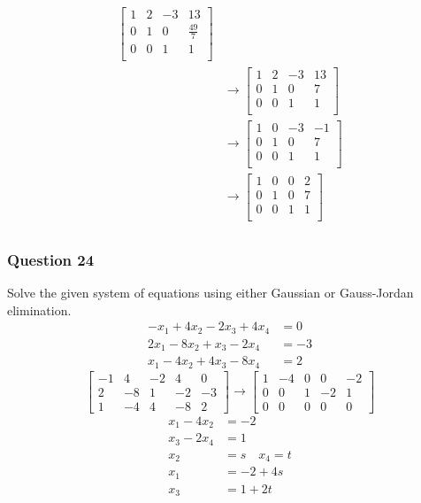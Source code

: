 \documentclass{math}
\begin{document}
\begin{align*}
\begin{bmatrix}
    1 & 2 & -3 & 13 \\
    0 & 1 & 0 & \frac{49}{7} \\
    0 & 0 & 1 & 1 \\
  \end{bmatrix} \\
  &\to \begin{bmatrix}
    1 & 2 & -3 & 13 \\
    0 & 1 & 0 & 7 \\
    0 & 0 & 1 & 1 \\
  \end{bmatrix} \\
  &\to \begin{bmatrix}
    1 & 0 & -3 & -1 \\
    0 & 1 & 0 & 7 \\
    0 & 0 & 1 & 1 \\
  \end{bmatrix} \\
  &\to \begin{bmatrix}
    1 & 0 & 0 & 2 \\
    0 & 1 & 0 & 7 \\
    0 & 0 & 1 & 1 \\
  \end{bmatrix} \\
\end{align*}

\subsubsection*{Question 24}
Solve the given system of equations using either Gaussian or Gauss-Jordan
elimination.
\begin{align*}
  -x_1+4x_2-2x_3+4x_4 &= 0 \\
  2x_1-8x_2+x_3-2x_4 &= -3 \\
  x_1-4x_2+4x_3-8x_4 &= 2
\end{align*}
\[ \begin{bmatrix}
  -1 & 4 & -2 & 4 & 0 \\
  2 & -8 & 1 & -2 & -3 \\
  1 & -4 & 4 & -8 & 2
\end{bmatrix} \to \begin{bmatrix}
  1 & -4 & 0 & 0 & -2 \\
  0 & 0 & 1 & -2 & 1 \\
  0 & 0 & 0 & 0 & 0
\end{bmatrix} \]
\begin{align*}
  x_1-4x_2 &= -2 \\
  x_3-2x_4 &= 1 \\
  x_2 &= s \quad x_4 = t \\
  x_1 &= -2+4s \\
  x_3 &= 1+2t
\end{align*}
\end{document}
